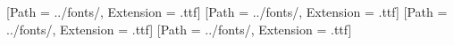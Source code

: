 








[Path = ../fonts/, Extension = .ttf]
[Path = ../fonts/, Extension = .ttf]
[Path = ../fonts/, Extension = .ttf]
\newCJKfontfamily{}[Path = ../fonts/, Extension = .ttf]




\setlength{\parindent}{2em} %
\setlength{\parskip}{0pt}   %

\usepackage{epigraph} 


\makeatletter
\renewcommand{\@makefntext}[1]{\jcz{\@thefnmark.} #1}
\makeatother
\usepackage{enumitem}



\usepackage{amsmath} %
\usepackage{amssymb} %




